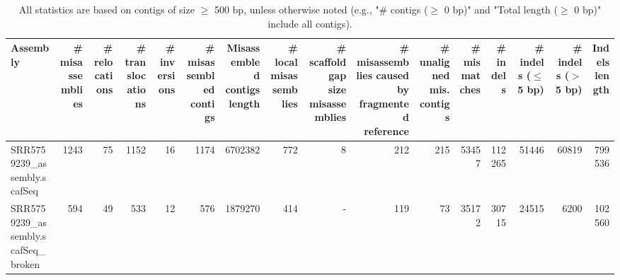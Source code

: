 \documentclass[12pt,a4paper]{article}
\begin{document}
\begin{table}[ht]
\begin{center}
\caption{All statistics are based on contigs of size $\geq$ 500 bp, unless otherwise noted (e.g., "\# contigs ($\geq$ 0 bp)" and "Total length ($\geq$ 0 bp)" include all contigs).}
\begin{tabular}{|l*{15}{|r}|}
\hline
Assembly & \# misassemblies &     \# relocations &     \# translocations &     \# inversions & \# misassembled contigs & Misassembled contigs length & \# local misassemblies & \# scaffold gap size misassemblies & \# misassemblies caused by fragmented reference & \# unaligned mis. contigs & \# mismatches & \# indels &     \# indels ($\leq$ 5 bp) &     \# indels ($>$ 5 bp) & Indels length \\ \hline
SRR5759239\_assembly.scafSeq & 1243 & 75 & 1152 & 16 & 1174 & 6702382 & 772 & 8 & 212 & 215 & 53457 & 112265 & 51446 & 60819 & 799536 \\ \hline
SRR5759239\_assembly.scafSeq\_broken & 594 & 49 & 533 & 12 & 576 & 1879270 & 414 & - & 119 & 73 & 35172 & 30715 & 24515 & 6200 & 102560 \\ \hline
\end{tabular}
\end{center}
\end{table}
\end{document}
